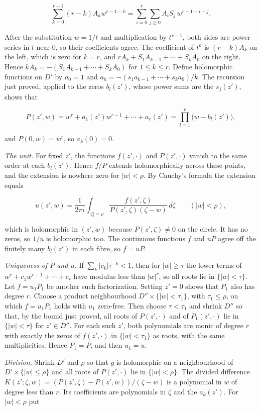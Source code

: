 \documentclass[11pt]{article}
\begin{document}
\[
\sum_{k=0}^{r-1}(r-k)A_kw^{r-1-k}=\sum_{i=0}^r\sum_{j\geq0}A_iS_j\,w^{r-1-i-j}.
\]

After the substitution \(w=1/t\) and multiplication by \(t^{r-1}\), both
sides are power series in \(t\) near \(0\), so their coefficients agree.
The coefficient of \(t^k\) is \((r-k)A_k\) on the left, which is zero
for \(k=r\), and \(rA_k+S_1A_{k-1}+\cdots+S_kA_0\) on the right. Hence
\(kA_k=-(S_1A_{k-1}+\cdots+S_kA_0)\) for \(1\leq k\leq r\). Define
holomorphic functions on \(D'\) by \(a_0=1\) and
\(a_k=-(s_1a_{k-1}+\cdots+s_ka_0)/k\). The recursion just proved,
applied to the zeros \(b_l(z')\), whose power sums are the \(s_j(z')\),
shows that

\[
P(z',w)=w^r+a_1(z')w^{r-1}+\cdots+a_r(z')=\prod_{l=1}^r\bigl(w-b_l(z')\bigr),
\]

and \(P(0,w)=w^r\), so \(a_k(0)=0\).

\emph{The unit.} For fixed \(z'\), the functions \(f(z',\cdot)\) and
\(P(z',\cdot)\) vanish to the same order at each \(b_l(z')\). Hence
\(f/P\) extends holomorphically across these points, and the extension
is nowhere zero for \(|w|<\rho\). By Cauchy's formula the extension
equals

\[
u(z',w)=\frac1{2\pi i}\int_{|\zeta|=\rho}\frac{f(z',\zeta)}{P(z',\zeta)(\zeta-w)}\,d\zeta\qquad(|w|<\rho),
\]

which is holomorphic in \((z',w)\) because \(P(z',\zeta)\neq0\) on the
circle. It has no zeros, so \(1/u\) is holomorphic too. The continuous
functions \(f\) and \(uP\) agree off the finitely many \(b_l(z')\) in
each fibre, so \(f=uP\).

\emph{Uniqueness of \(P\) and \(u\).} If \(\sum_k|c_k|\tau^{-k}<1\),
then for \(|w|\geq\tau\) the lower terms of
\(w^r+c_1w^{r-1}+\cdots+c_r\) have modulus less than \(|w|^r\), so all
roots lie in \(\{|w|<\tau\}\). Let \(f=u_1P_1\) be another such
factorization. Setting \(z'=0\) shows that \(P_1\) also has degree
\(r\). Choose a product neighbourhood \(D''\times\{|w|<\tau_1\}\), with
\(\tau_1\leq\rho\), on which \(f=u_1P_1\) holds with \(u_1\) zero-free.
Then choose \(\tau<\tau_1\) and shrink \(D''\) so that, by the bound
just proved, all roots of \(P(z',\cdot)\) and of \(P_1(z',\cdot)\) lie
in \(\{|w|<\tau\}\) for \(z'\in D''\). For each such \(z'\), both
polynomials are monic of degree \(r\) with exactly the zeros of
\(f(z',\cdot)\) in \(\{|w|<\tau_1\}\) as roots, with the same
multiplicities. Hence \(P_1=P\), and then \(u_1=u\).

\emph{Division.} Shrink \(D'\) and \(\rho\) so that \(g\) is holomorphic
on a neighbourhood of \(\overline{D'}\times\{|w|\leq\rho\}\) and all
roots of \(P(z',\cdot)\) lie in \(\{|w|<\rho\}\). The divided difference
\(K(z';\zeta,w)=(P(z',\zeta)-P(z',w))/(\zeta-w)\) is a polynomial in
\(w\) of degree less than \(r\). Its coefficients are polynomials in
\(\zeta\) and the \(a_k(z')\). For \(|w|<\rho\) put
\end{document}
